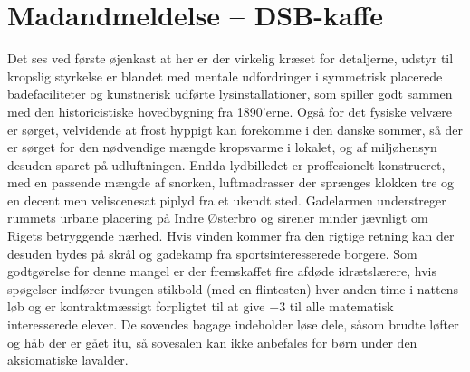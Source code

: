 \documentclass[article,10pt,a4,oneside]{memoir}
\begin{document}
\begin{minipage}[b]{1.95\textwidth}
\begin{minipage}[t]{0.23\linewidth}
\section*{Madandmeldelse -- DSB-kaffe}
Det ses ved første øjenkast at her er der virkelig kræset for detaljerne, udstyr til kropslig styrkelse er blandet med mentale udfordringer i symmetrisk placerede badefaciliteter og kunstnerisk udførte lysinstallationer, som spiller godt sammen med den historicistiske hovedbygning fra 1890'erne. Også for det fysiske velvære er sørget, velvidende at frost hyppigt kan forekomme i den danske sommer, så der er sørget for den nødvendige mængde kropsvarme i lokalet, og af miljøhensyn desuden sparet på udluftningen.
Endda lydbilledet er proffesionelt konstrueret, med en passende mængde af snorken, luftmadrasser der sprænges klokken tre og en decent men veliscenesat piplyd fra et ukendt sted. Gadelarmen understreger rummets urbane placering på Indre Østerbro og sirener minder jævnligt om Rigets betryggende nærhed. Hvis vinden kommer fra den rigtige retning kan der desuden bydes på skrål og gadekamp fra sportsinteresserede borgere. Som godtgørelse for denne mangel er der fremskaffet fire afdøde idrætslærere, hvis spøgelser indfører tvungen stikbold (med en flintesten) hver anden time i nattens løb og er kontraktmæssigt forpligtet til at give $-3$ til alle matematisk interesserede elever. 
De sovendes bagage indeholder løse dele, såsom brudte løfter og håb der er gået itu, så sovesalen kan ikke anbefales for børn under den aksiomatiske lavalder.

\end{minipage}
\end{minipage}
\eject \pdfpagewidth=201mm \pdfpageheight=297mm
\end{document}
